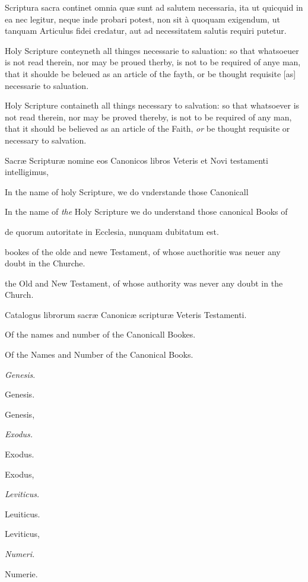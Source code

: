
Scriptura sacra continet omnia quæ sunt ad salutem necessaria, ita ut quicquid in ea nec legitur, neque inde probari potest, non sit à quoquam exigendum, ut tanquam Articulus fidei credatur, aut ad necessitatem salutis requiri putetur.

Holy Scripture conteyneth all thinges necessarie to saluation: so that whatsoeuer is not read therein, nor may be proued therby, is not to be required of anye man, that it shoulde be beleued as an article of the fayth, or be thought requisite [as] necessarie to saluation.

Holy Scripture containeth all things necessary to salvation: so that whatsoever is not read therein, nor may be proved thereby, is not to be required of any man, that it should be believed as an article of the Faith, \emph{or} be thought requisite or necessary to salvation.

Sacræ Scripturæ nomine eos Canonicos libros Veteris et Novi testamenti intelligimus,

In the name of holy Scripture, we do vnderstande those Canonicall

In the name of \emph{the} Holy Scripture we do understand those canonical Books of

de quorum autoritate in Ecclesia, nunquam dubitatum est.

bookes of the olde and newe Testament, of whose aucthoritie was neuer any doubt in the Churche.

the Old and New Testament, of whose authority was never any doubt in the Church.

Catalogus librorum sacræ Canonicæ scripturæ Veteris Testamenti.

Of the names and number of the Canonicall Bookes.

Of the Names and Number of the Canonical Books.

\emph{Genesis}.

Genesis.

Genesis,

\emph{Exodus.}

Exodus.

Exodus,

\emph{Leviticus.}

Leuiticus.

Leviticus,

\emph{Numeri.}

Numerie.

